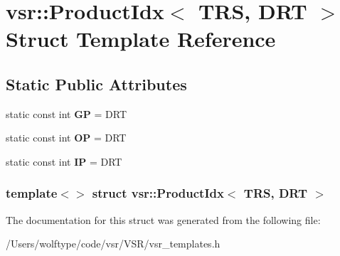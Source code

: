 \hypertarget{structvsr_1_1_product_idx_3_01_t_r_s_00_01_d_r_t_01_4}{\section{vsr\-:\-:Product\-Idx$<$ T\-R\-S, D\-R\-T $>$ Struct Template Reference}
\label{structvsr_1_1_product_idx_3_01_t_r_s_00_01_d_r_t_01_4}
}
\subsection*{Static Public Attributes}
\begin{DoxyCompactItemize}
\item 
\hypertarget{structvsr_1_1_product_idx_3_01_t_r_s_00_01_d_r_t_01_4_adcfe8e7914f529d1ecd58b96a1c206cf}{static const int {\bfseries G\-P} = D\-R\-T}\label{structvsr_1_1_product_idx_3_01_t_r_s_00_01_d_r_t_01_4_adcfe8e7914f529d1ecd58b96a1c206cf}

\item 
\hypertarget{structvsr_1_1_product_idx_3_01_t_r_s_00_01_d_r_t_01_4_abb6ccd843243b773d5c1721ee09004ab}{static const int {\bfseries O\-P} = D\-R\-T}\label{structvsr_1_1_product_idx_3_01_t_r_s_00_01_d_r_t_01_4_abb6ccd843243b773d5c1721ee09004ab}

\item 
\hypertarget{structvsr_1_1_product_idx_3_01_t_r_s_00_01_d_r_t_01_4_abb661356b25bc2deb228ad36ffbd2d13}{static const int {\bfseries I\-P} = D\-R\-T}\label{structvsr_1_1_product_idx_3_01_t_r_s_00_01_d_r_t_01_4_abb661356b25bc2deb228ad36ffbd2d13}

\end{DoxyCompactItemize}
\subsubsection*{template$<$$>$ struct vsr\-::\-Product\-Idx$<$ T\-R\-S, D\-R\-T $>$}



The documentation for this struct was generated from the following file\-:\begin{DoxyCompactItemize}
\item 
/\-Users/wolftype/code/vsr/\-V\-S\-R/vsr\-\_\-templates.\-h\end{DoxyCompactItemize}
